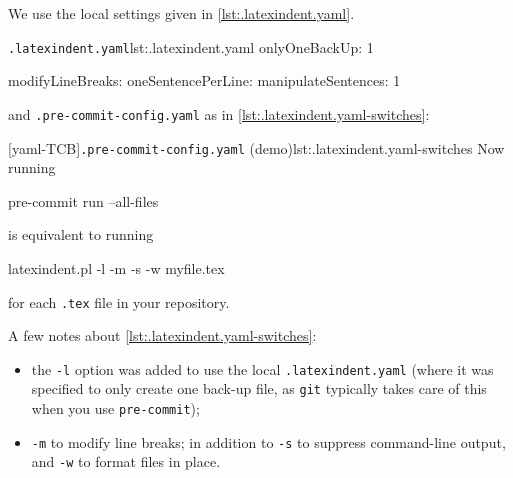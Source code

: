   \begin{example}
  We use the local settings given in \cref{lst:.latexindent.yaml}.
  \begin{cmhlistings}[style=tcblatex]{\texttt{.latexindent.yaml}}{lst:.latexindent.yaml}
onlyOneBackUp: 1

modifyLineBreaks:
 oneSentencePerLine:
   manipulateSentences: 1
\end{cmhlistings}

  and \texttt{.pre-commit-config.yaml} as in \cref{lst:.latexindent.yaml-switches}:

  [yaml-TCB]{\texttt{.pre-commit-config.yaml} (demo)}{lst:.latexindent.yaml-switches}
  Now running

  \begin{commandshell}
pre-commit run --all-files
\end{commandshell}

  is equivalent to running

  \begin{commandshell}
latexindent.pl -l -m -s -w myfile.tex
\end{commandshell}

  for each \texttt{.tex} file in your repository.

  A few notes about \cref{lst:.latexindent.yaml-switches}:
  \begin{itemize}
   \item the \texttt{-l} option was added to use the local \texttt{.latexindent.yaml} (where it
         was specified to only create one back-up file, as \texttt{git} typically takes care of
         this when you use \texttt{pre-commit});
   \item \texttt{-m} to modify line breaks; in addition to \texttt{-s} to suppress command-line
         output, and \texttt{-w} to format files in place.
  \end{itemize}
  \end{example}

